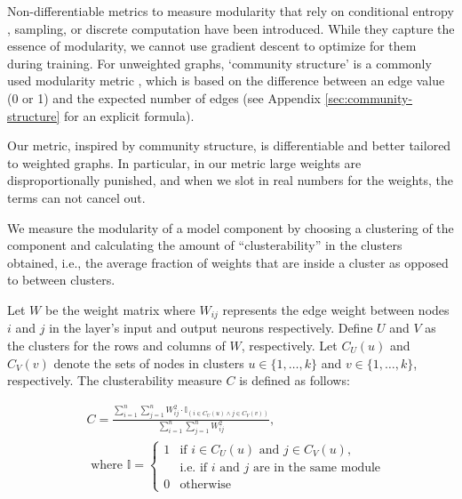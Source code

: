 Non-differentiable metrics to measure modularity that rely on conditional entropy \citep{ursino2020transfer}, sampling, or discrete computation \cite{veniat2021efficientcontinuallearningmodular} have been introduced. While they capture the essence of modularity, we cannot use gradient descent to optimize for them during training.
For unweighted graphs, `community structure' is a commonly used modularity metric \citep{newman2006modularity, salha2022modularity, tsitsulin2023graph, bhowmick2024neural}, which is based on the difference between an edge value (0 or 1) and the expected number of edges (see Appendix \ref{sec:community-structure} for an explicit formula).

Our metric, inspired by community structure, is differentiable and better tailored to weighted graphs. In particular, in our metric large weights are disproportionally punished, and when we slot in real numbers for the weights, the terms can not cancel out. 

We measure the modularity of a model component by choosing a clustering of the component and calculating the amount of ``clusterability'' in the clusters obtained, i.e., the average fraction of weights that are inside a cluster as opposed to between clusters.


Let \( W \) be the weight matrix where \( W_{ij} \) represents the edge weight between nodes \( i \) and \( j \) in the layer's input and output neurons respectively. Define \( U \) and \( V \) as the clusters for the rows and columns of \( W \), respectively. Let \( C_U(u) \) and \( C_V(v) \) denote the sets of nodes in clusters \( u \in \{1, \ldots, k\} \) and \( v \in \{1, \ldots, k\} \), respectively.
The clusterability measure \( C \) is defined as follows:

\begin{align*}
&C = \frac{\sum\limits_{i=1}^{n} \sum\limits_{j=1}^{n} W_{ij}^2 \cdot \mathbb{I}_{(i \in C_U(u) \land j \in C_V(v))}}{\sum\limits_{i=1}^{n} \sum\limits_{j=1}^{n} W_{ij}^2}, \\
&\text{ where }
\mathbb{I} =
\begin{cases} 
1 & \text{if } i \in C_U(u) \text{ and } j \in C_V(u) , \\ 
  & \text{i.e. if $i$ and $j$ are in the same module} \\
0 & \text{otherwise}
\end{cases}
\end{align*}

